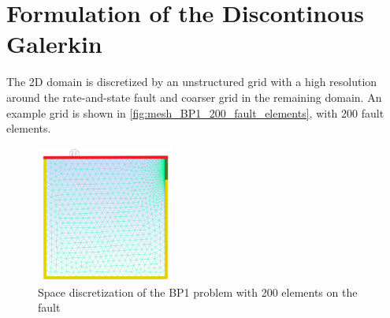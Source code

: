\section{Formulation of the Discontinous Galerkin}
The 2D domain is discretized by an unstructured grid with a high resolution around the rate-and-state fault and coarser grid in the remaining domain. An example grid is shown in \autoref{fig:mesh_BP1_200_fault_elements}, with 200 fault elements.

\begin{figure}[H]
	\centering
	\includegraphics[width=0.4\textwidth]{images/BP1_mesh_with_boundaries.pdf}
	\caption{Space discretization of the BP1 problem with 200 elements on the fault}
	\label{fig:mesh_BP1_200_fault_elements}
\end{figure}

